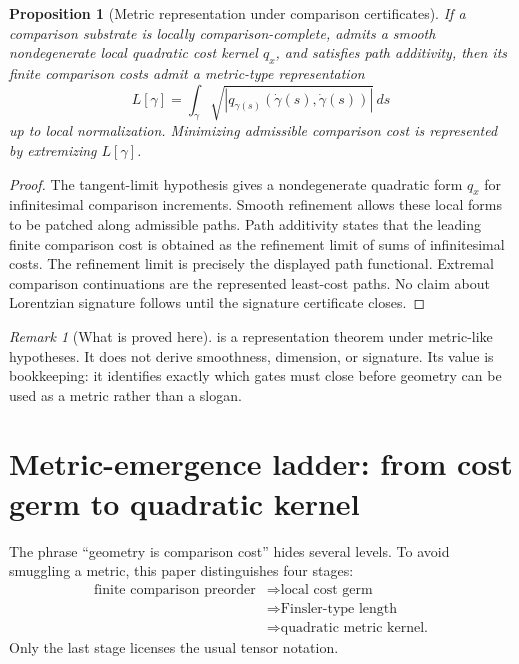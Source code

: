 \documentclass[11pt]{article}
\newtheorem{proposition}[theorem]{Proposition}
\theoremstyle{remark}
\newtheorem{remark}[theorem]{Remark}
\begin{document}
\begin{proposition}[Metric representation under comparison certificates]
\label{prop:metric-rep}
If a comparison substrate is locally comparison-complete, admits a smooth nondegenerate local quadratic cost kernel \(q_x\), and satisfies path additivity, then its finite comparison costs admit a metric-type representation
\[
        L[\gamma]
        =
        \int_\gamma \sqrt{|q_{\gamma(s)}(\dot\gamma(s),\dot\gamma(s))|}\,ds
\]
up to local normalization.  Minimizing admissible comparison cost is represented by extremizing \(L[\gamma]\).
\end{proposition}

\begin{proof}
The tangent-limit hypothesis gives a nondegenerate quadratic form \(q_x\) for infinitesimal comparison increments.  Smooth refinement allows these local forms to be patched along admissible paths.  Path additivity states that the leading finite comparison cost is obtained as the refinement limit of sums of infinitesimal costs.  The refinement limit is precisely the displayed path functional.  Extremal comparison continuations are the represented least-cost paths.  No claim about Lorentzian signature follows until the signature certificate closes.
\end{proof}

\begin{remark}[What is proved here]
 is a representation theorem under metric-like hypotheses.  It does not derive smoothness, dimension, or signature.  Its value is bookkeeping: it identifies exactly which gates must close before geometry can be used as a metric rather than a slogan.
\end{remark}

\section{Metric-emergence ladder: from cost germ to quadratic kernel}\label{sec:metric-emergence}

The phrase ``geometry is comparison cost'' hides several levels.  To avoid smuggling a metric, this paper distinguishes four stages:
\[
\begin{aligned}
\text{finite comparison preorder}
&\Longrightarrow \text{local cost germ}\\
&\Longrightarrow \text{Finsler-type length}\\
&\Longrightarrow \text{quadratic metric kernel.}
\end{aligned}
\]
Only the last stage licenses the usual tensor notation.
\end{document}
